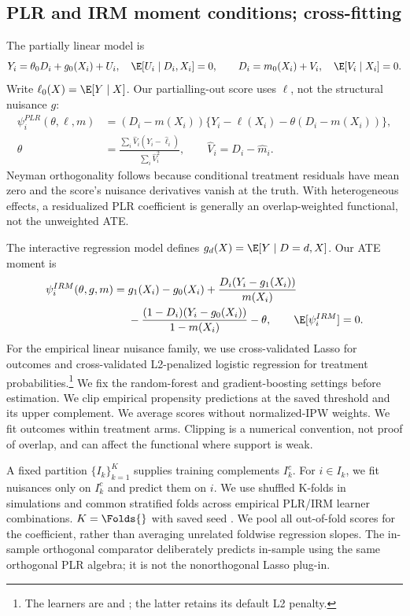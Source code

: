 \subsection{PLR and IRM moment conditions; cross-fitting}
The partially linear model is
\begin{equation}
 Y_i=\theta_0 D_i+g_0(X_i)+U_i,\quad \E[U_i\mid D_i, X_i]=0,
 \qquad D_i=m_0(X_i)+V_i,\quad \E[V_i\mid X_i]=0.
\end{equation}
Write $\ell_0(X)=\E[Y\mid X]$. Our partialling-out score uses $\ell$, not the structural nuisance $g$:
\begin{align}
 \psi^{PLR}_i(\theta,\ell, m)&=(D_i-m(X_i))\{Y_i-\ell(X_i)-\theta(D_i-m(X_i))\},\\
 \widehat\theta&=\frac{\sum_i\widehat V_i(Y_i-\widehat\ell_i)}{\sum_i\widehat V_i^2},
 \qquad \widehat V_i=D_i-\widehat m_i.
\end{align}
Neyman orthogonality follows because conditional treatment residuals have mean zero and the score's nuisance derivatives vanish at the truth. With heterogeneous effects, a residualized PLR coefficient is generally an overlap-weighted functional, not the unweighted ATE.

The interactive regression model defines $g_d(X)=\E[Y\mid D=d, X]$. Our ATE moment is
\begin{align}
 \psi^{IRM}_i(\theta, g, m)={}&g_1(X_i)-g_0(X_i)
 +\frac{D_i(Y_i-g_1(X_i))}{m(X_i)}\nonumber\\
 &-\frac{(1-D_i)(Y_i-g_0(X_i))}{1-m(X_i)}-\theta,
 \qquad \E[\psi^{IRM}_i]=0.
\end{align}
For the empirical linear nuisance family, we use cross-validated Lasso for outcomes and cross-validated L2-penalized logistic regression for treatment probabilities.\footnote{The learners are  and ; the latter retains its default L2 penalty.} We fix the random-forest and gradient-boosting settings before estimation. We clip empirical propensity predictions at the saved threshold \Clip{} and its upper complement. We average scores without normalized-IPW weights. We fit outcomes within treatment arms. Clipping is a numerical convention, not proof of overlap, and can affect the functional where support is weak.

A fixed partition $\{I_k\}_{k=1}^{K}$ supplies training complements $I_k^c$. For $i\in I_k$, we fit nuisances only on $I_k^c$ and predict them on $i$. We use shuffled K-folds in simulations and common stratified folds across empirical PLR/IRM learner combinations. $K=\Folds{}$ with saved seed \Seed{}. We pool all out-of-fold scores for the coefficient, rather than averaging unrelated foldwise regression slopes. The in-sample orthogonal comparator deliberately predicts in-sample using the same orthogonal PLR algebra; it is not the nonorthogonal Lasso plug-in.
